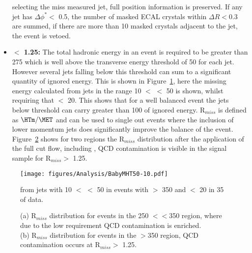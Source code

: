 \begin{itemize}
selecting the miss measured jet, full position information is preserved. If any 
jet has $\Delta\phi^{*} <$ 0.5, the number of masked ECAL crystals within 
$\Delta R < $0.3 are summed, if there are more than 10 masked crystals adjacent 
to the jet, the event is vetoed.
\item \textbf{\Rmiss$ <$ 1.25:} The total hadronic energy in an event is 
required to be greater than \unit{275}{\GeV} which is well above the transverse 
energy threshold of \unit{50}{\GeV} for each jet. However several jets falling 
below this threshold can sum to a significant quantity of ignored energy. This 
is shown in Figure~\ref{fig:figures_Analysis_BabyMHT50-10}, here the missing 
energy calculated from jets in the range \unit{10}{\GeV} $<$ \ET $<$ 
\unit{50}{\GeV} is shown, whilst requiring that \MET $<$ \unit{20}{\GeV}. This 
shows that for a well balanced event the jets below threshold can carry greater 
than \unit{100}{\GeV} of ignored energy. R$_{miss}$ is defined as $\HTm \slash 
\MET$ and can be used to single out events where the inclusion of lower 
momentum jets does significantly improve the balance of the event. 
Figure~\ref{fig:MHTovMET_lowHT_highHT} shows for two \HT regions the R$_{miss}$ 
distribution after the application of the full cut flow, including \alt, QCD 
contamination is visible in the signal sample for R$_{miss} >$ 1.25. 
\end{itemize}


\begin{figure}[htbp]
  \centering
    \texttt{[image: figures/Analysis/BabyMHT50-10.pdf]}
  \caption{\HTm from jets with \unit{10}{\GeV} $<$ \ET $<$ \unit{50}{\GeV} in events with \HT $>$ \unit{350}{\GeV} and \MET $<$ \unit{20}{\GeV} in \unit{35}{\invpicobarn} of data.}
  \label{fig:figures_Analysis_BabyMHT50-10}
\end{figure}

\begin{figure}[htbp]
  \centering
\caption{(a) R$_{miss}$ distribution for events in the \unit{250}{\GeV} 
$<$\HT$<$\unit{350}{\GeV} region, where due to the low \HT requirement QCD 
contamination is enriched. \\ (b) R$_{miss}$ distribution for events in the 
\HT$>$\unit{350}{\GeV} region, QCD contamination occurs at R$_{miss} >$ 1.25.}
\label{fig:MHTovMET_lowHT_highHT}
\end{figure}


